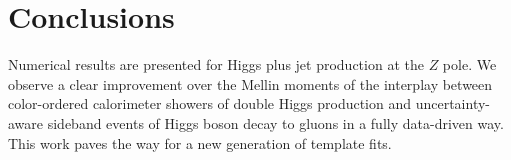\section{Conclusions}\label{sec:conclusions}

Numerical results are presented for Higgs plus jet production at the $Z$
pole. We observe a clear improvement over the Mellin moments of the
interplay between color-ordered calorimeter showers of double Higgs
production and uncertainty-aware sideband events of Higgs boson decay to
gluons in a fully data-driven way. This work paves the way for a new
generation of template fits.

